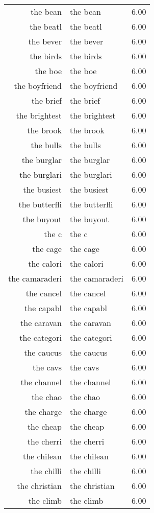 \begin{table}[ht]
\begin{tabular}{rlr}
  the bean & the bean & 6.00 \\ 
  the beatl & the beatl & 6.00 \\ 
  the bever & the bever & 6.00 \\ 
  the birds & the birds & 6.00 \\ 
  the boe & the boe & 6.00 \\ 
  the boyfriend & the boyfriend & 6.00 \\ 
  the brief & the brief & 6.00 \\ 
  the brightest & the brightest & 6.00 \\ 
  the brook & the brook & 6.00 \\ 
  the bulls & the bulls & 6.00 \\ 
  the burglar & the burglar & 6.00 \\ 
  the burglari & the burglari & 6.00 \\ 
  the busiest & the busiest & 6.00 \\ 
  the butterfli & the butterfli & 6.00 \\ 
  the buyout & the buyout & 6.00 \\ 
  the c & the c & 6.00 \\ 
  the cage & the cage & 6.00 \\ 
  the calori & the calori & 6.00 \\ 
  the camaraderi & the camaraderi & 6.00 \\ 
  the cancel & the cancel & 6.00 \\ 
  the capabl & the capabl & 6.00 \\ 
  the caravan & the caravan & 6.00 \\ 
  the categori & the categori & 6.00 \\ 
  the caucus & the caucus & 6.00 \\ 
  the cavs & the cavs & 6.00 \\ 
  the channel & the channel & 6.00 \\ 
  the chao & the chao & 6.00 \\ 
  the charge & the charge & 6.00 \\ 
  the cheap & the cheap & 6.00 \\ 
  the cherri & the cherri & 6.00 \\ 
  the chilean & the chilean & 6.00 \\ 
  the chilli & the chilli & 6.00 \\ 
  the christian & the christian & 6.00 \\ 
  the climb & the climb & 6.00 \\ 

\end{tabular}
\end{table}
